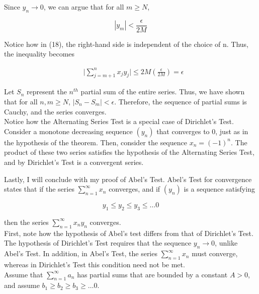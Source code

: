\documentclass{article}
\begin{document}
Since $y_n \rightarrow 0$, we can argue that for all $m \geq N$, 

\begin{equation}
    | y_m | < \frac{\epsilon}{2M}
\end{equation}

Notice how in (18), the right-hand side is independent of the choice of n. Thus, the inequality becomes

\begin{equation}
\begin{split}
    &\Bigg|\sum_{j=m+1}^{n} x_j y_j \Bigg| \leq 2M(\frac{\epsilon}{2M}) = \epsilon
\end{split}
\end{equation}

Let $S_n$ represent the $n^{th}$ partial sum of the entire series. Thus, we have shown that for all $n, m \geq N$, $|S_n - S_m| < \epsilon$. Therefore, the sequence of partial sums is Cauchy, and the series converges. \\

Notice how the Alternating Series Test is a special case of Dirichlet's Test. Consider a monotone decreasing sequence $(y_n)$ that converges to 0, just as in the hypothesis of the theorem. Then, consider the sequence $x_n = (-1)^n$. The product of these two series satisfies the hypothesis of the Alternating Series Test, and by Dirichlet's Test is a convergent series. 

\newpage

Lastly, I will conclude with my proof of Abel's Test. Abel's Test for convergence states that if the series $\sum_{n=1}^\infty x_n$ converges, and if $(y_n)$ is a sequence satisfying 

\begin{equation}
    y_1 \leq y_2 \leq y_3 \leq \dots 0
\end{equation}

then the series $\sum_{n=1}^\infty x_n y_n$ converges. \\

First, note how the hypothesis of Abel's test differs from that of Dirichlet's Test. The hypothesis of Dirichlet's Test requires that the sequence $y_n \rightarrow 0$, unlike Abel's Test. In addition, in Abel's Test, the series $\sum_{n=1}^\infty x_n$ must converge, whereas in Dirichlet's Test this condition need not be met. \\

Assume that $\sum_{n=1}^\infty a_n$ has partial sums that are bounded by a constant $A > 0$, and assume $b_1 \geq b_2 \geq b_3 \geq \dots 0$. 
\end{document}
